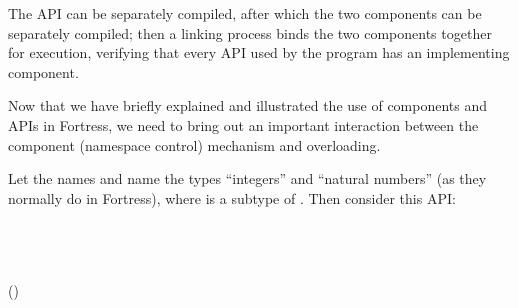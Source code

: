 The API can be separately compiled, after which the
two components can be separately compiled; then a linking
process binds the two components together for execution,
verifying that every API used by the program has an
implementing component.

Now that we have briefly explained and illustrated
the use of components and APIs in Fortress, we need to
bring out an important interaction between the component
(namespace control) mechanism and overloading.

Let the names  and  name the types
``integers'' and ``natural numbers''
(as they normally do in Fortress), where  is a subtype of .
Then consider this API:
\begin{codeexamplesize}
\begin{FortressCode}
  \\
 \\
  \\
\2\+ (\ultrathin)\COLON {}\- \\
 \\
 \\
 
\end{FortressCode}
\end{codeexamplesize}

